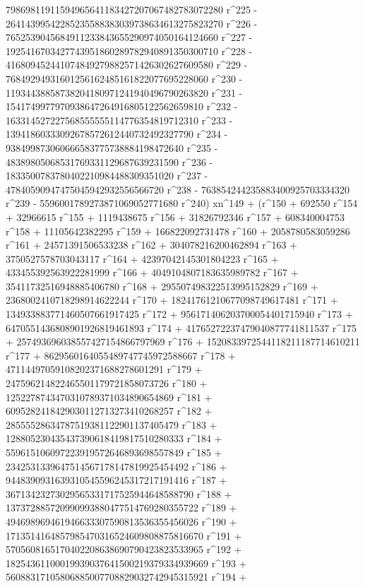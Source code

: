        79869811911594965641183427207067482783072280 r^225 - 
       26414399542285235588383039738634613275823270 r^226 - 
       7652539045684911233843655290974050164124660 r^227 - 
       1925416703427743951860289782940891350300710 r^228 - 
       416809452441074849279882571426302627609580 r^229 - 
       76849294931601256162485161822077695228060 r^230 - 
       11934438858738204180971241940496790263820 r^231 - 
       1541749977970938647264916805122562659810 r^232 - 
       163314527227568555555114776354819712310 r^233 - 
       13941860333092678572612440732492327790 r^234 - 
       938499873060666583775738884198472640 r^235 - 
       48389805068531769331129687639231590 r^236 - 
       1833500783780402210984488309351020 r^237 - 
       47840590947475045942932556566720 r^238 - 
       763854244235883400925703334320 r^239 - 
       5596001789273871069052771680 r^240) xn^149 + (r^150 + 
       692550 r^154 + 32966615 r^155 + 1119438675 r^156 + 
       31826792346 r^157 + 608340004753 r^158 + 
       11105642382295 r^159 + 166822092731478 r^160 + 
       2058780583059286 r^161 + 24571391506533238 r^162 + 
       304078216200462894 r^163 + 3750527578703043117 r^164 + 
       42397042145301804223 r^165 + 433455392563922281999 r^166 + 
       4049104807183635989782 r^167 + 35411732516948885406780 r^168 + 
       295507498322513995152829 r^169 + 
       2368002410718298914622244 r^170 + 
       18241761210677098749617481 r^171 + 
       134933883771460507661917425 r^172 + 
       956171406203700054401715940 r^173 + 
       6470551436808901926819461893 r^174 + 
       41765272237479040877741811537 r^175 + 
       257493696038557427154866797969 r^176 + 
       1520833972544118211187714610211 r^177 + 
       8629560164055489747745972588667 r^178 + 
       47114497059108202371688278601291 r^179 + 
       247596214822465501179721858073726 r^180 + 
       1252278743470310789371034890654869 r^181 + 
       6095282418429030112713273410268257 r^182 + 
       28555528634787519381122901137405479 r^183 + 
       128805230435437390618419817510280333 r^184 + 
       559615106097223919572646893698557849 r^185 + 
       2342531339647514567178147819925454492 r^186 + 
       9448390931639310545596245317217191416 r^187 + 
       36713423273029565331717525944648588790 r^188 + 
       137372885720990993880477514769280355722 r^189 + 
       494698969461946633307590813536355456026 r^190 + 
       1713514164857985470316524609808875816670 r^191 + 
       5705608165170402208638690790423823533965 r^192 + 
       18254361100019939037641500219379334939669 r^193 + 
       56088317105806885007708829032742945315921 r^194 + 
